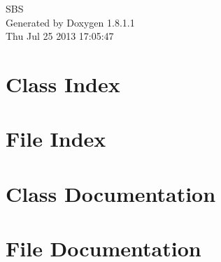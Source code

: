 \documentclass{book}
\begin{document}
\hypersetup{pageanchor=false,citecolor=blue}
\begin{titlepage}
\vspace*{7cm}
\begin{center}
{\Large S\-B\-S }\\
\vspace*{1cm}
{\large Generated by Doxygen 1.8.1.1}\\
\vspace*{0.5cm}
{\small Thu Jul 25 2013 17:05:47}\\
\end{center}
\end{titlepage}
\clearemptydoublepage
{}
\tableofcontents
\clearemptydoublepage
{}
\hypersetup{pageanchor=true,citecolor=blue}
\chapter{Class Index}

\chapter{File Index}

\chapter{Class Documentation}



















\chapter{File Documentation}




































\printindex
\end{document}
